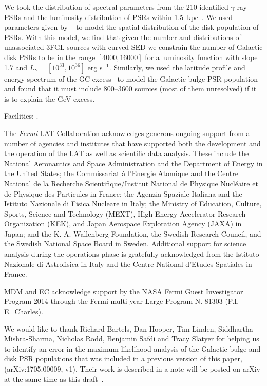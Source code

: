 \documentclass[iop]{emulateapj}
\begin{document}
We took the distribution of spectral parameters from the 210
identified $\gamma$-ray PSRs and the luminosity distribution of PSRs
within 1.5~kpc~\footnotemark[8].  We used parameters given by
~\citet{2004IAUS..218..105L, Calore:2014oga} to model the spatial
distribution of the disk population of PSRs.  With this model, we find
that given the number and distributions of unassociated 3FGL sources
with curved SED we constrain the number of Galactic disk PSRs to be in
the range $[4000,16000]$ for a luminosity function with slope 1.7 and
$L_{\gamma}=[10^{33},10^{36}]$ erg s$^{-1}$.  Similarly, we used the
latitude profile and energy spectrum of the GC
excess~\citep[e.g.,][]{Calore:2014xka,TheFermi-LAT:2017vmf} to model
the Galactic bulge PSR population and found that it must include 
800--3600 sources (most of them unresolved) if it is to explain the
GeV excess.

Facilities: .

  

\begin{acknowledgements}
  The {\it Fermi} LAT Collaboration acknowledges generous ongoing
  support from a number of agencies and institutes that have supported
  both the development and the operation of the LAT as well as
  scientific data analysis. These include the National Aeronautics and
  Space Administration and the Department of Energy in the United
  States; the Commissariat \`a l'Energie Atomique and the Centre
  National de la Recherche Scientifique/Institut National de Physique
  Nucl\'eaire et de Physique des Particules in France; the Agenzia
  Spaziale Italiana and the Istituto Nazionale di Fisica Nucleare in
  Italy; the Ministry of Education, Culture, Sports, Science and
  Technology (MEXT), High Energy Accelerator Research Organization
  (KEK), and Japan Aerospace Exploration Agency (JAXA) in Japan; and
  the K. A. Wallenberg Foundation, the Swedish Research Council, and
  the Swedish National Space Board in Sweden.  Additional support for
  science analysis during the operations phase is gratefully
  acknowledged from the Istituto Nazionale di Astrofisica in Italy and
  the Centre National d'Etudes Spatiales in France.

  MDM and EC acknowledge support by the NASA Fermi Guest Investigator
  Program 2014 through the Fermi multi-year Large Program N. 81303
  (P.I. E.~Charles).

  We would like to thank Richard Bartels, Dan Hooper, Tim Linden,
  Siddhartha Mishra-Sharma, Nicholas Rodd, Benjamin Safdi and Tracy
  Slatyer for helping us to identify an error in the maximum
  likelihood analysis of the Galactic bulge and disk PSR populations 
  that was included in a previous version of this paper,
  (arXiv:1705.00009, v1).  Their work is described in a note will
  be posted on arXiv at the same time as this draft~\citep{bartels:XX}.

\end{acknowledgements}
\end{document}
